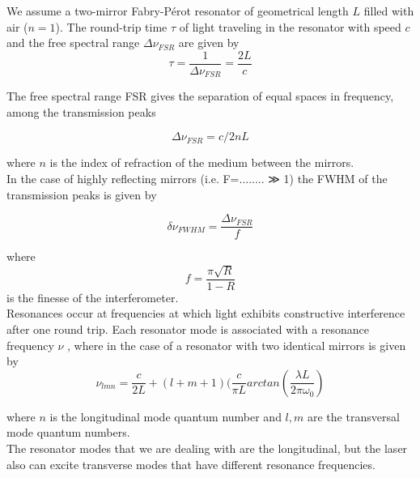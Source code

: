 \documentclass[openany,11pt,a4paper]{book}
\begin{document}
We assume a two-mirror Fabry-Pérot resonator of geometrical length $L$ filled with air ($n=1$). The round-trip time $\tau $ of light traveling in the resonator with speed  $c$ and the free spectral range  $\Delta \nu_{FSR}$ are given by
\begin{equation}
\tau =\dfrac{1}{\Delta \nu_{FSR}}=\dfrac{2L }{c}
\end{equation}


The free spectral range FSR gives the separation of equal spaces in frequency, among the transmission peaks

\begin{equation}
\Delta\nu _{FSR}= c/2nL
\end{equation}

where $n$ is the index of refraction of the medium between the mirrors.\\

In the case of highly reflecting mirrors (i.e. F=........ ≫ 1) the FWHM of the transmission
peaks is given by


\begin{equation}
\delta \nu _{FWHM}=  \dfrac{\Delta\nu _{FSR}}{f}    
\end{equation}

where
\begin{equation}
 f = \dfrac{\pi \sqrt{R}}{1-R}
 \end{equation}
 is the finesse of the interferometer.\\




Resonances occur at frequencies at which light exhibits constructive interference after one round trip.
Each resonator mode is associated with a resonance frequency  $\nu$ , where in the case of a resonator with two identical mirrors is given by
\begin{equation}
\nu _{lmn}= \dfrac{c}{2L} +(l+m+1)(\dfrac{c}{\pi L} arctan(\dfrac{\lambda L} {2\pi \omega_{0}})
\end{equation}


where $n$ is the longitudinal mode quantum number and $l,m$ are the transversal mode quantum numbers.\\


The resonator modes that we are dealing with are the longitudinal, but the laser also can
excite transverse modes that have different resonance frequencies.\\

\end{document}
